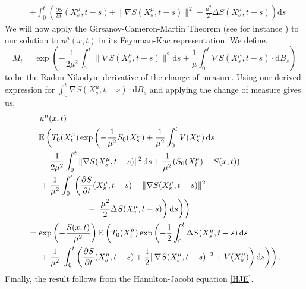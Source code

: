 \documentclass[a4paper,12pt,draft]{report}
\theoremstyle{remark}
\theoremstyle{definition}
\begin{document}
{\begin{align}
& + \int _0^t\left(\frac{\partial S}{\partial t}(X^{\mu}_{s}, t - s) + \|\nabla S(X^{\mu}_{s}, t - s)\|^2 - \frac{\mu^2}{2}\Delta S(X^{\mu}_{s}, t - s)\right)\mathrm{d}s\nonumber
\end{align}
We will now apply the Girsanov-Cameron-Martin Theorem (see for instance \cite{Oksendal}) to our solution to $u^\mu(x, t)$ in its Feynman-Kac representation.  We define,
$$
M_t = \exp\left(-\frac{1}{2\mu^2}\int _0^t \|\nabla S(X^{\mu}_{s}, t - s)\|^2 \mathrm{d}s + \frac{1}{\mu}\int _0^t \nabla S(X^{\mu}_{s}, t - s)\cdot \mathrm{d}B_s\right)
$$
to be the Radon-Nikodym derivative of the change of measure.  Using our derived expression for $\int _0^t\nabla S(X^{\mu}_{s}, t - s)\cdot\mathrm{d}B_{s}$ and applying the change of measure gives us,
\begin{align}
& \hspace{0.5cm} u^\mu(x, t)\nonumber\\
& = \mathbb{E}\left(T_{0}(X^{\mu}_{t})\exp\left(-\frac{1}{\mu^2}S_{0}(X^{\mu}_{s}) + \frac{1}{\mu^2}\int_0^t V(X^{\mu}_{s})\,\mathrm{d}s\right.\right. \nonumber\\
& \hspace{0.5cm} - \frac{1}{2\mu^2}\int _0^t \|\nabla S(X^{\mu}_{s}, t - s)\|^2\,\mathrm{d}s + \frac{1}{\mu^2}(S_{0}(X^{\mu}_{t}) - S(x, t))\nonumber\\
& \hspace{0.5cm} + \frac{1}{\mu^2}\int _0^t\left(\frac{\partial S}{\partial t}(X^{\mu}_{s}, t - s) + \|\nabla S(X^{\mu}_{s}, t - s)\|^2\right.\nonumber\\
& \hspace{2.5cm} - \left.\left.\left.\frac{\mu^2}{2}\Delta S(X^{\mu}_{s}, t - s)\right)\mathrm{d}s\right)\right)\nonumber\\
& = \exp\left(-\frac{S(x, t)}{\mu^2}\right)\mathbb{E}\left(T_{0}(X^{\mu}_{t})\exp\left( - \frac{1}{2}\int_0^t \Delta S(X^{\mu}_{s}, t - s)\,\mathrm{d}s\right.\right.\nonumber \\
& \hspace{0.5cm} + \frac{1}{\mu^2}\left.\left.\int _0^t\left(\frac{\partial S}{\partial t}(X^{\mu}_{s}, t - s) + \frac{1}{2}\|\nabla S(X^{\mu}_{s}, t - s)\|^2 + V(X^{\mu}_{s})\right)\mathrm{d}s\right)\right).\nonumber
\end{align}
Finally, the result follows from the Hamilton-Jacobi equation \eqref{HJE}.

\qedhere
}
\end{document}
